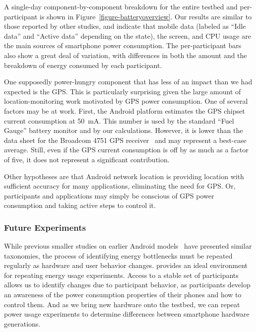 A single-day component-by-component breakdown for the entire testbed and
per-participant is shown in Figure~\ref{figure-batteryoverview}. Our results are
similar to those reported by other studies, and indicate that mobile data
(labeled as ``Idle data'' and ``Active data'' depending on the state), the
screen, and CPU usage are the main sources of smartphone power consumption. The
per-participant bars also show a great deal of variation, with differences in
both the amount and the breakdown of energy consumed by each participant.

One supposedly power-hungry component that has less of an impact than we had
expected is the GPS. This is particularly surprising given the large amount
of location-monitoring work motivated by GPS power consumption. One of
several factors may be at work. First, the Android platform estimates the GPS
chipset current consumption at 50~mA. This number is used by the standard
``Fuel Gauge'' battery monitor and by our calculations. However, it is lower
than the data sheet for the Broadcom 4751 GPS receiver~\cite{bcm4751} and may
represent a best-case average. Still, even if the GPS current consumption is off
by as much as a factor of five, it does not represent a significant
contribution.

Other hypotheses are that Android network location is providing location
with sufficient accuracy for many applications, eliminating the need for GPS.
Or, participants and applications may simply be conscious of GPS power
consumption and taking active steps to control it.

\subsubsection{Future Experiments}

While previous smaller studies on earlier Android
models~\cite{shye:micro:2009} have presented similar taxonomies, the process
of identifying energy bottlenecks must be repeated regularly as hardware and
user behavior changes. \PhoneLab{} provides an ideal environment for
repeating energy usage experiments. Access to a stable set of participants
allows us to identify changes due to participant behavior, as participants
develop an awareness of the power consumption properties of their phones and
how to control them. And as we bring new hardware onto the testbed, we can
repeat power usage experiments to determine differences between smartphone
hardware generations.

